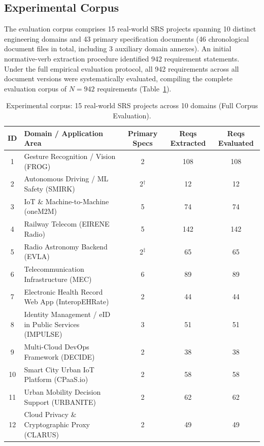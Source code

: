 \documentclass[journal]{IEEEtran}
\begin{document}
\subsection{Experimental Corpus}
\label{sec:corpus}

The evaluation corpus comprises 15 real-world SRS projects spanning 10 distinct engineering domains and 43 primary specification documents (46 chronological document files in total, including 3 auxiliary domain annexes). An initial normative-verb extraction procedure identified 942 requirement statements. Under the full empirical evaluation protocol, all 942 requirements across all document versions were systematically evaluated, compiling the complete evaluation corpus of $N=942$ requirements (Table~\ref{tab:corpus}).

\begin{table}[htbp]
\centering
\caption{Experimental corpus: 15 real-world SRS projects across 10 domains (Full Corpus Evaluation).}
\label{tab:corpus}
\small
\setlength{\tabcolsep}{3pt}
\begin{tabularx}{\columnwidth}{@{}c>{\raggedright\arraybackslash}Xccc@{}}
\toprule
\textbf{ID} & \textbf{Domain / Application Area} & \textbf{Primary Specs} & \textbf{Reqs Extracted} & \textbf{Reqs Evaluated} \\
\midrule
1  & Gesture Recognition / Vision (FROG)           & 2 & 108 & 108 \\
2  & Autonomous Driving / ML Safety (SMIRK)       & 2$^\dagger$ & 12  & 12  \\
3  & IoT \& Machine-to-Machine (oneM2M)            & 5 & 74  & 74  \\
4  & Railway Telecom (EIRENE Radio)                 & 5 & 142 & 142 \\
5  & Radio Astronomy Backend (EVLA)                 & 2$^\ddagger$ & 65  & 65  \\
6  & Telecommunication Infrastructure (MEC)        & 6 & 89  & 89  \\
7  & Electronic Health Record Web App (InteropEHRate) & 2 & 44  & 44  \\
8  & Identity Management / eID in Public Services (IMPULSE) & 3 & 51  & 51  \\
9  & Multi-Cloud DevOps Framework (DECIDE)          & 2 & 38  & 38  \\
10 & Smart City Urban IoT Platform (CPaaS.io)       & 2 & 58  & 58  \\
11 & Urban Mobility Decision Support (URBANITE)     & 2 & 62  & 62  \\
12 & Cloud Privacy \& Cryptographic Proxy (CLARUS)  & 2 & 49  & 49  \\

\end{tabularx}
\end{table}
\end{document}
